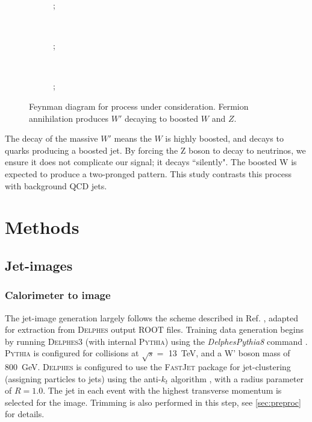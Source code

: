 \documentclass{report}
\newcommand{\pkg}[1]{\textsc{#1}}
\begin{document}
	\begin{figure}[H]
		\centering
		\begin{subfigure}[t]{0.3\linewidth}
			\centering
			;
		\end{subfigure}%
		~ 
		\begin{subfigure}[t]{0.3\linewidth}
			\centering
			;
		\end{subfigure}
		~
		\begin{subfigure}[t]{0.3\linewidth}
			\centering
			;
		\end{subfigure}
	\caption{Feynman diagram for process under consideration. Fermion annihilation produces $W'$ decaying to boosted $W$ and $Z$.}
	\label{fig:feynmans}
	\end{figure}

The decay of the massive $W'$ means the $W$ is highly boosted, and decays to quarks producing a boosted jet. By forcing the Z boson to decay to neutrinos, we ensure it does not complicate our signal; it decays ``silently". The boosted W is expected to produce a two-pronged pattern. This study contrasts this process with background QCD jets.
 





\chapter{Methods}
\label{sec:methods}

\section{Jet-images}
\subsection{Calorimeter to image}
The jet-image generation largely follows the scheme described in Ref. \cite{de2015jet}, adapted for extraction from \pkg{Delphes} output \pkg{ROOT} files. Training data generation begins by running \pkg{Delphes}3 (with internal \pkg{Pythia}) using the \textit{DelphesPythia8} command \cite{workbook}. \pkg{Pythia} is configured for collisions at $\sqrt{s} =$ \SI{13}{\tera\electronvolt}, and a W' boson mass of \SI{800}{\giga\electronvolt}. \pkg{Delphes} is configured to use the \pkg{FastJet} \cite{fastjet} package for jet-clustering (assigning particles to jets) using the anti-$k_t$ algorithm \cite{antikt}, with a radius parameter of $R=1.0$. The jet in each event with the highest transverse momentum is selected for the image. Trimming is also performed in this step, see \cref{sec:preproc} for details.
\end{document}
